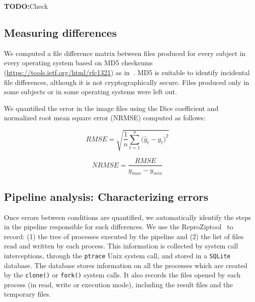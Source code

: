 \documentclass{article}
\newcommand{\todo}[1]{\color{red}\textbf{TODO:}#1\color{black}}
\newcommand{\reprozip}[0]{ReproZip}
\begin{document}
\todo{Check ~\cite{DBLP:journals/fini/DasGRSPMSRSKMKR17}}

\subsection{Measuring differences}



We computed a file difference matrix between files produced for every
subject in every operating system based on MD5 checksums~\cite{md5}
(\url{https://tools.ietf.org/html/rfc1321}) as
in~\cite{Scaria2017}. MD5 is suitable to identify incidental file
differences, although it is not cryptographically secure. Files
produced only in some subjects or in some operating systems were left out.

We quantified the error in the image files using the Dice coefficient and normalized root mean square error (NRMSE) computed as follows:
\begin{center}
\begin{equation}
RMSE = {\sqrt {\frac{1} {n}{\sum\limits_{t = 1}^n {(\hat{y}_{t} - {y}_{t} } })^{2} } }
\end{equation}
\end{center}

\begin{center}
\begin{equation}
NRMSE = {\frac{RMSE} {y_{max} - y_{min}}}
\end{equation}
\end{center}

\subsection{Pipeline analysis: Characterizing errors}

Once errors between conditions are quantified, we automatically
identify the steps in the pipeline responsible for such differences.
We use the \reprozip tool~\cite{reprozip} to record: (1) the tree of
processes executed by the pipeline and (2) the list of files read and
written by each process. This information is collected by system call
interceptions, through the \texttt{ptrace} Unix system call, and
stored in a \texttt{SQLite} database. The database stores information
on all the processes which are created by the \texttt{clone()} or
\texttt{fork()} system calls. It also records the files opened by each
process (in read, write or execution mode), including the result files
and the temporary files.
\end{document}
